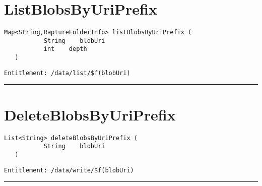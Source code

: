 \section{ListBlobsByUriPrefix}
\label{Api:ListBlobsByUriPrefix}
\begin{lstlisting}[style=nonumbers]
   Map<String,RaptureFolderInfo> listBlobsByUriPrefix (
           String    blobUri
           int    depth
   )
\end{lstlisting}
\begin{Verbatim}[formatcom=\color{Maroon}]
  Entitlement: /data/list/$f(blobUri)
\end{Verbatim}



\rule{12cm}{2pt}
\section{DeleteBlobsByUriPrefix}
\label{Api:DeleteBlobsByUriPrefix}
\begin{lstlisting}[style=nonumbers]
   List<String> deleteBlobsByUriPrefix (
           String    blobUri
   )
\end{lstlisting}
\begin{Verbatim}[formatcom=\color{Maroon}]
  Entitlement: /data/write/$f(blobUri)
\end{Verbatim}



\rule{12cm}{2pt}

